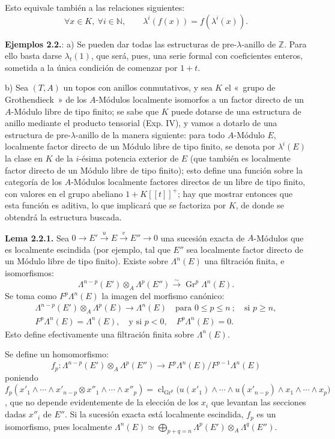 Esto equivale también a las relaciones siguientes:
\[
  \forall x\in K,\ \forall i\in\mathbb N,\qquad
  \lambda^i(f(x))=f(\lambda^i(x)).
\]

\textbf{Ejemplos 2.2.}: a) Se pueden dar todas las estructuras de pre-\(\lambda\)-anillo de \(\mathbb Z\). Para ello basta darse \(\lambda_t(1)\), que será, pues, una serie formal con coeficientes enteros, sometida a la única condición de comenzar por \(1+t\).

b) Sea \((T,A)\) un topos con anillos conmutativos, y sea \(K\) el «~grupo de Grothendieck~» de los \(A\)-Módulos localmente isomorfos a un factor directo de un \(A\)-Módulo libre de tipo finito; se sabe que \(K\) puede dotarse de una estructura de anillo mediante el producto tensorial (Exp. IV), y vamos a dotarlo de una estructura de pre-\(\lambda\)-anillo de la manera siguiente: para todo \(A\)-Módulo \(E\), localmente factor directo de un Módulo libre de tipo finito, se denota por \(\lambda^i(E)\) la clase en \(K\) de la \(i\)-ésima potencia exterior de \(E\) (que también es localmente factor directo de un Módulo libre de tipo finito); esto define una función sobre la categoría de los \(A\)-Módulos localmente factores directos de un libre de tipo finito, con valores en el grupo abeliano \(1+K[[t]]^+\); hay que mostrar entonces que esta función es aditiva, lo que implicará que se factoriza por \(K\), de donde se obtendrá la estructura buscada.

\textbf{Lema 2.2.1.} Sea \(0\longrightarrow E' \xrightarrow{u} E \xrightarrow{v} E''\longrightarrow0\) una sucesión exacta de \(A\)-Módulos que es localmente escindida (por ejemplo, tal que \(E''\) sea localmente factor directo de un Módulo libre de tipo finito). Existe sobre \(\Lambda^n(E)\) una filtración finita, e isomorfismos:
\[
  \Lambda^{n-p}(E')\otimes_A\Lambda^p(E'')
  \xrightarrow{\sim}
  \operatorname{Gr}^p\Lambda^n(E).
\]
Se toma como \(F^p\Lambda^n(E)\) la imagen del morfismo canónico:
\[
\begin{gathered}
  \Lambda^{n-p}(E')\otimes_A\Lambda^p(E)\longrightarrow\Lambda^n(E)
  \quad\text{para } 0\leq p\leq n\ ;\quad \text{si } p\geq n,\\
  F^p\Lambda^n(E)=\Lambda^n(E),\quad \text{y si } p<0,\quad F^p\Lambda^n(E)=0.
\end{gathered}
\]
Esto define efectivamente una filtración finita sobre \(\Lambda^n(E)\).

Se define un homomorfismo:
\[
  f_p:\Lambda^{n-p}(E')\otimes_A\Lambda^p(E'')
  \longrightarrow F^p\Lambda^n(E)/F^{p-1}\Lambda^n(E)
\]
poniendo \(f_p(x'_1\wedge\cdots\wedge x'_{n-p}\otimes x''_1\wedge\cdots\wedge x''_p)=\operatorname{cl}_{\operatorname{Gr}^p}\bigl(u(x'_1)\wedge\cdots\wedge u(x'_{n-p})\wedge x_1\wedge\cdots\wedge x_p\bigr)\), que no depende evidentemente de la elección de los \(x_i\) que levantan las secciones dadas \(x''_i\) de \(E''\). Si la sucesión exacta está localmente escindida, \(f_p\) es un isomorfismo, pues localmente \(\Lambda^n(E)\simeq\bigoplus_{p+q=n}\Lambda^p(E')\otimes_A\Lambda^q(E'')\).


